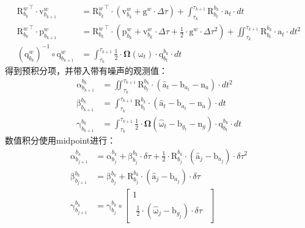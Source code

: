 \documentclass[12pt, onecolumn]{article}
\newcommand\bsm[1]{\boldsymbol{\mathrm{#1}}}
\newcommand\rotation[2]{{\bsm{R}_{#1}^{#2}}}
\newcommand\quaternion[2]{{\bsm{q}_{#1}^{#2}}}
\newcommand\translation[2]{{\bsm{p}_{#1}^{#2}}}
\newcommand\linvel[2]{{\bsm{v}_{#1}^{#2}}}
\newcommand\gravity[1]{{\bsm{g}^{#1}}}
\begin{document}
	\begin{equation}
	\begin{aligned}
		\rotation{b_{k}}{w}^\top\cdot\linvel{b_{k+1}}{w}&=\rotation{b_{k}}{w}^\top\cdot\left( \linvel{b_{k}}{w}+\gravity{w}\cdot\Delta\tau\right) 
		+\int_{\tau_{k}}^{\tau_{k+1}}
		\rotation{b_t}{b_{k}} \cdot \bsm{a}_t \cdot dt
		\\
		\rotation{b_{k}}{w}^\top\cdot\translation{b_{k+1}}{w}&=\rotation{b_{k}}{w}^\top\cdot\left( \translation{b_{k}}{w}
		+\linvel{b_{k}}{w}\cdot\Delta\tau
		+\frac{1}{2}\cdot\gravity{w}\cdot\Delta\tau^2\right) +\iint_{\tau_{k}}^{\tau_{k+1}}
		\rotation{b_t}{b_{k}} \cdot \bsm{a}_t \cdot dt^2
		\\
		\left( \quaternion{b_k}{w}\right) ^{-1}\circ\quaternion{b_{k+1}}{w}&=
		 \int_{\tau_{k}}^{\tau_{k+1}}\frac{1}{2}\cdot\boldsymbol{\Omega}(\bsm{\omega}_t)\cdot\quaternion{b_t}{b_k}\cdot dt
	\end{aligned}
	\end{equation}
	得到预积分项，并带入带有噪声的观测值：
	\begin{equation}
	\begin{aligned}
	\bsm{\alpha}_{b_{k+1}}^{b_k}&=\iint_{\tau_{k}}^{\tau_{k+1}}
				\rotation{b_t}{b_{k}} \cdot \left( \hat{\bsm{a}}_t-\bsm{b}_{a_t}-\bsm{n}_a\right) \cdot dt^2
				\\
	\bsm{\beta}_{b_{k+1}}^{b_k}&=\int_{\tau_{k}}^{\tau_{k+1}}
			\rotation{b_t}{b_{k}} \cdot \left( \hat{\bsm{a}}_t-\bsm{b}_{a_t}-\bsm{n}_a\right)  \cdot dt
			\\
	\bsm{\gamma}_{b_{k+1}}^{b_k}&=\int_{\tau_{k}}^{\tau_{k+1}}\frac{1}{2}\cdot\boldsymbol{\Omega}(\hat{\bsm{\omega}}_t-\bsm{b}_{g_t}-\bsm{n}_g)\cdot\quaternion{b_t}{b_k}\cdot dt
	\end{aligned}
	\end{equation}
	数值积分使用midpoint进行：
	\begin{equation}
	\begin{aligned}
	\bsm{\alpha}_{b_{j+1}}^{b_k}&=\bsm{\alpha}_{b_{j}}^{b_k}+\bsm{\beta}_{b_{j}}^{b_k}\cdot\delta \tau+\frac{1}{2}\cdot\rotation{b_j}{b_k}\cdot\left( \hat{\bsm{a}}_j-\bsm{b}_{a_j}\right) \cdot\delta \tau^2
	\\
	\bsm{\beta}_{b_{j+1}}^{b_k}&=\bsm{\beta}_{b_{j}}^{b_k}+\rotation{b_j}{b_k}\cdot\left( \hat{\bsm{a}}_j-\bsm{b}_{a_j}\right) \cdot\delta \tau
	\\
	\bsm{\gamma}_{b_{j+1}}^{b_k}&=\bsm{\gamma}_{b_{j}}^{b_k}\circ\begin{bmatrix}
	1\\\begin{aligned}
	\frac{1}{2}\cdot\left(\hat{\bsm{\omega}}_j-\bsm{b}_{g_j} \right) \cdot\delta \tau
	\end{aligned}
	\end{bmatrix}
	\end{aligned}
	\end{equation}
\end{document}
